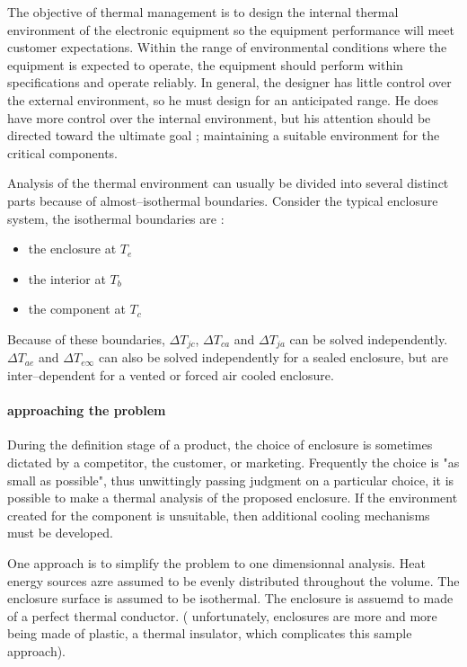 
The objective of thermal management is to design the internal
thermal environment of the electronic equipment so the equipment
performance will meet customer expectations. Within the range of
environmental conditions where the equipment is expected to operate,
the equipment should perform within specifications and operate
reliably. In general, the designer has little control over the
external environment, so he must design for an anticipated range. He
does have more control over the internal environment, but his
attention should be directed toward the ultimate goal ; maintaining
a suitable environment for the critical components.

Analysis of the thermal environment can usually be divided into
several distinct parts because of almost--isothermal boundaries.
Consider the typical enclosure system, the isothermal boundaries are
:

\begin{itemize}

\item the enclosure at $T_e$
\item the interior at $T_b$
\item the component at $T_c$

\end{itemize}

Because of these boundaries, $\Delta T_{jc}$, $\Delta T_{ca}$ and
$\Delta T_{ja}$ can be solved independently. $\Delta T_{ae}$ and
$\Delta T_{e\infty}$ can also be solved independently for a sealed
enclosure, but are inter--dependent for a vented or forced air
cooled enclosure.

\paragraph{approaching the problem}

During the definition stage of a product, the choice of enclosure is
sometimes dictated by a competitor, the customer, or marketing.
Frequently the choice is "as small as possible", thus unwittingly
passing judgment on a particular choice, it is possible to make a
thermal analysis of the proposed enclosure. If the environment
created for the component is unsuitable, then additional cooling
mechanisms must be developed.

One approach is to simplify the problem to one dimensionnal analysis.
Heat energy sources azre assumed to be evenly distributed throughout
the volume. The enclosure surface is assumed to be isothermal. The
enclosure is assuemd to made of a perfect thermal conductor. (
unfortunately, enclosures are more and more being made of plastic, a
thermal insulator, which complicates this sample approach).

